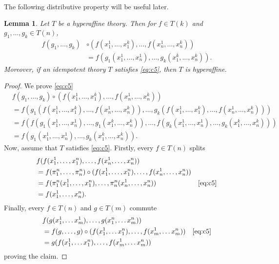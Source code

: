 \documentclass{amsart}
\numberwithin{equation}{section}
\theoremstyle{plain}
\newtheorem{lemma}[theorem]{Lemma}
\theoremstyle{definition}
\begin{document}
The following distributive property will be useful later. 
\begin{lemma}
  \label{lem:c5}
  Let $T$ be a hyperaffine theory. 
  Then for $f \in T(k)$ and $g_1, \ldots, g_k \in T(n)$,
  \begin{equation}
    \label{eq:c5}
    \begin{split}
        f(g_1, \ldots, g_k) & \circ (f(x^1_1, \ldots, x^k_1), \ldots, f(x^1_n, \ldots, x^k_n)) \\
        & =     f(g_1(x^1_1, \ldots, x^1_n), \ldots, g_k(x^k_1, \ldots, x^k_n))\text{.}
    \end{split}
  \end{equation}
  Moreover, if an idempotent theory $T$ satisfies \eqref{eq:c5}, then $T$ is hyperaffine. 
\end{lemma}
\begin{proof}
    We prove \eqref{eq:c5} 
    \begin{align*}
        & f(g_1, \ldots, g_k) \circ (f(x^1_1, \ldots, x^k_1), \ldots, f(x^1_n, \ldots, x^k_n)) \\
        & = f(g_1(f(x^1_1, \ldots, x^k_1), \ldots, f(x^1_n, \ldots, x^k_n)), \ldots, g_k(f(x^1_1, \ldots, x^k_1), \ldots, f(x^1_n, \ldots, x^k_n)))\\
        & = f(f(g_1(x^1_1, \ldots, x^1_n), \ldots, g_1(x^k_1, \ldots, x^k_n)), \ldots, f(g_k(x^1_1, \ldots, x^1_n), \ldots, g_k(x^k_1, \ldots, x^k_n)))\\
        & = f(g_1(x^1_1, \ldots, x^1_n), \ldots, g_k(x^k_1, \ldots, x^k_n))\text{.}
    \end{align*}
  Now, assume that $T$ satisfies \eqref{eq:c5}. 
  Firstly, every $f \in T(n)$ splits 
  \begin{align*}
    & f(f(x^1_1, \ldots, x^n_1), \ldots, f(x^1_n, \ldots, x^n_n)) &  \\
    & = f(\pi^n_1, \ldots, \pi^n_n) \circ (f(x^1_1, \ldots, x^n_1), \ldots, f(x^1_n, \ldots, x^n_n)) & \\
    & = f(\pi^n_1(x^1_1, \ldots, x^n_1), \ldots, \pi^n_n(x^1_n, \ldots, x^n_n)) & \eqref{eq:c5} \\
    & = f(x^1_1, \ldots, x^n_n)   \text{.} &
  \end{align*}
  Finally, every $f \in T(n)$ and $g \in T(m)$ commute
  \begin{align*}
    & f(g(x^1_1, \ldots x^1_m), \ldots, g(x^n_1, \ldots x^n_m)) & \\
    & = f(g, \ldots, g) \circ (f(x^1_1, \ldots x^n_1), \ldots, f(x^1_m, \ldots x^n_m)) & \eqref{eq:c5}\\
    & = g(f(x^1_1, \ldots x^n_1), \ldots, f(x^1_m, \ldots x^n_m)) & 
  \end{align*}
  proving the claim. 
\end{proof}
\end{document}
